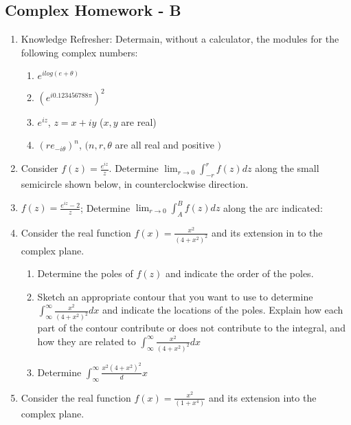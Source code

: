 \documentclass[12pt]{article}
\begin{document}
\subsection{Complex Homework - B}
\begin{enumerate}

    \item Knowledge Refresher:
	    Determain, without a calculator, the modules for the following complex numbers: 
	    \begin{enumerate}

	        \item $e^{ilog(e+\theta)}$
		\item $(e^{i0.123456788 \pi})^{2}$
		\item $e^{iz}$, $z=x+iy$ ($x,y$ are real) 
		\item $(re_{-i \theta})^{n}$, $(n,r,\theta$ are all real and positive $)$

	    \end{enumerate}
	
	\item Consider $f(z) = \frac{e^{iz}}{z}$. Determine $\lim_{r\to0} \int_{-r}^{r}f(z)dz$ along the small semicircle shown below, in counterclockwise direction.
	
	\item $f(z)=\frac{e^{iz}-2}{z}$; Determine $\lim_{r\to0}\int_{A}^{B}f(z)dz$ along the arc indicated:

	\item Consider the real function $f(x)= \frac{x^{2}}{(4+x^{2})^{2}}$ and its extension in to the complex plane.
		\begin{enumerate}

		    \item Determine the poles of $f(z)$ and indicate the order of the poles.
			    \item Sketch an appropriate contour that you want to use to determine $\int_{\infty}^{\infty} \frac{x^{2}}{(4+x^{2})^{2}}dx$ and indicate the locations of the poles. Explain how each part of the contour contribute or does not contribute to the integral, and how they are related to $\int_{\infty}^{\infty} \frac{x^{2}}{(4+x^{2})^{2}}dx$

		\item Determine $\int_{\infty}^{\infty} \frac{{x^{2}}(4+x^{2})^{2}}dx$

		\end{enumerate}

\item Consider the real function $f(x)= \frac{x^{2}}{(1+x^{4})}$ and its extension into the complex plane.
	\begin{enumerate}


\end{enumerate}
\end{enumerate}
\end{document}
